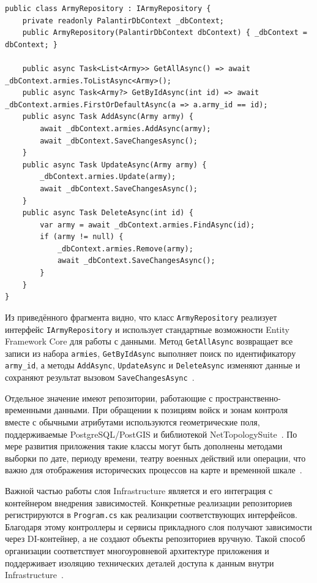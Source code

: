 \begin{code}
\label{code:army-repository}
\vspace{-0.75cm}
\begin{verbatim}
public class ArmyRepository : IArmyRepository {   
    private readonly PalantirDbContext _dbContext;
    public ArmyRepository(PalantirDbContext dbContext) { _dbContext = dbContext; }

    public async Task<List<Army>> GetAllAsync() => await _dbContext.armies.ToListAsync<Army>();
    public async Task<Army?> GetByIdAsync(int id) => await _dbContext.armies.FirstOrDefaultAsync(a => a.army_id == id);
    public async Task AddAsync(Army army) {
        await _dbContext.armies.AddAsync(army);
        await _dbContext.SaveChangesAsync();
    }
    public async Task UpdateAsync(Army army) {
        _dbContext.armies.Update(army);
        await _dbContext.SaveChangesAsync();
    }
    public async Task DeleteAsync(int id) {
        var army = await _dbContext.armies.FindAsync(id);
        if (army != null) {
            _dbContext.armies.Remove(army);
            await _dbContext.SaveChangesAsync();
        }
    }
}
\end{verbatim}
\end{code}

Из приведённого фрагмента видно, что класс \texttt{ArmyRepository} реализует интерфейс \texttt{IArmyRepository} и использует стандартные возможности Entity Framework Core для работы с данными. Метод \texttt{GetAllAsync} возвращает все записи из набора \texttt{armies}, \texttt{GetByIdAsync} выполняет поиск по идентификатору \texttt{army\_id}, а методы \texttt{AddAsync}, \texttt{UpdateAsync} и \texttt{DeleteAsync} изменяют данные и сохраняют результат вызовом \texttt{SaveChangesAsync}~\cite{smith_efcore_in_action}.

Отдельное значение имеют репозитории, работающие с пространственно-временными данными. При обращении к позициям войск и зонам контроля вместе с обычными атрибутами используются геометрические поля, поддерживаемые PostgreSQL/PostGIS и библиотекой NetTopologySuite~\cite{npgsql_postgis_nts}. 
По мере развития приложения такие классы могут быть дополнены методами выборки по дате, периоду времени, театру военных действий или операции, что важно для отображения исторических процессов на карте и временной шкале~\cite{efcore_spatial}.

Важной частью работы слоя Infrastructure является и его интеграция с контейнером внедрения зависимостей. Конкретные реализации репозиториев регистрируются в \texttt{Program.cs} как реализации соответствующих интерфейсов. Благодаря этому контроллеры и сервисы прикладного слоя получают зависимости через DI-контейнер, а не создают объекты репозиториев вручную. Такой способ организации соответствует многоуровневой архитектуре приложения и поддерживает изоляцию технических деталей доступа к данным внутри Infrastructure~\cite{aspnet_dependency_injection}.

